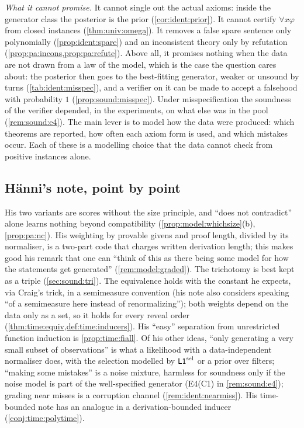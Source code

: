 \emph{What it cannot promise.} It cannot single out the actual axioms: inside the generator class the posterior is the prior (\cref{cor:ident:prior}). It cannot certify $\forall x\varphi$ from closed instances (\cref{thm:univ:omega}). It removes a false spare sentence only polynomially (\cref{prop:ident:spare}) and an inconsistent theory only by refutation (\cref{prop:pa:incons,prop:pa:refute}). Above all, it promises nothing when the data are not drawn from a law of the model, which is the case the question cares about: the posterior then goes to the best-fitting generator, weaker or unsound by turns (\cref{tab:ident:misspec}), and a verifier on it can be made to accept a falsehood with probability $1$ (\cref{prop:sound:misspec}). Under misspecification the soundness of the verifier depended, in the experiments, on what else was in the pool (\cref{rem:sound:e4}). The main lever is to model how the data were produced: which theorems are reported, how often each axiom form is used, and which mistakes occur. Each of these is a modelling choice that the data cannot check from positive instances alone.

\subsection{H\"anni's note, point by point}\label{sec:disc:hanni}

His two variants are scores without the size principle, and ``does not contradict'' alone learns nothing beyond compatibility (\cref{prop:model:whichsize}(b), \cref{prop:pa:nc}). His weighting by provable givens and proof length, divided by its normaliser, is a two-part code that charges written derivation length; this makes good his remark that one can ``think of this as there being some model for how the statements get generated'' (\cref{rem:model:graded}). The trichotomy is best kept as a triple (\cref{sec:sound:tri}). The equivalence holds with the constant he expects, via Craig's trick, in a semimeasure convention (his note also considers speaking ``of a semimeasure here instead of renormalizing''); both weights depend on the data only as a set, so it holds for every reveal order (\cref{thm:time:equiv,def:time:inducers}). His ``easy'' separation from unrestricted function induction is \cref{prop:time:fiall}. Of his other ideas, ``only generating a very small subset of observations'' is what a likelihood with a data-independent normaliser does, with the selection modelled by $\mathord{\mathsf{L1}}^{\mathrm{sel}}$ or a prior over filters; ``making some mistakes'' is a noise mixture, harmless for soundness only if the noise model is part of the well-specified generator (E4(C1) in \cref{rem:sound:e4}); grading near misses is a corruption channel (\cref{rem:ident:nearmiss}). His time-bounded note has an analogue in a derivation-bounded inducer (\cref{conj:time:polytime}).

